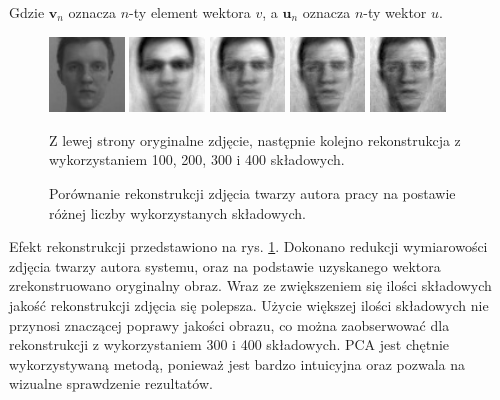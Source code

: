 \documentclass[oneside, eng]{mgr}
\newcommand{\bb}{\textbf}
\begin{document}
Gdzie $\bb{v}_n$ oznacza $n$-ty element wektora $v$, a $\bb{u}_n$ oznacza $n$-ty wektor $u$.

\begin{figure}
\centering
	\parbox{2cm}{
		\includegraphics[width=2cm]{face_1.jpg}
		}
		\qquad
		\begin{minipage}{2cm}
			\includegraphics[width=2cm]{100.jpg}
		\end{minipage}
		\begin{minipage}{2cm}
			\includegraphics[width=2cm]{200.jpg}
		\end{minipage}
		\begin{minipage}{2cm}
			\includegraphics[width=2cm]{300.jpg}
		\end{minipage}
		\begin{minipage}{2cm}
			\includegraphics[width=2cm]{400.jpg}
		\end{minipage}
	\caption{Porównanie rekonstrukcji zdjęcia twarzy autora pracy na postawie różnej liczby wykorzystanych składowych.} 
	Z lewej strony oryginalne zdjęcie, następnie kolejno rekonstrukcja z wykorzystaniem 100, 200, 300 i 400 składowych.
	\label{fig:rekonstrukcja}
\end{figure}

Efekt rekonstrukcji przedstawiono na rys. \ref{fig:rekonstrukcja}. Dokonano redukcji wymiarowości zdjęcia twarzy autora systemu, oraz na podstawie uzyskanego wektora zrekonstruowano oryginalny obraz. Wraz ze zwiększeniem się ilości składowych jakość rekonstrukcji zdjęcia się polepsza. Użycie większej ilości składowych nie przynosi znaczącej poprawy jakości obrazu, co można zaobserwować dla rekonstrukcji z wykorzystaniem 300 i 400 składowych. PCA jest chętnie wykorzystywaną metodą, ponieważ jest bardzo intuicyjna oraz pozwala na wizualne sprawdzenie rezultatów.
\end{document}
